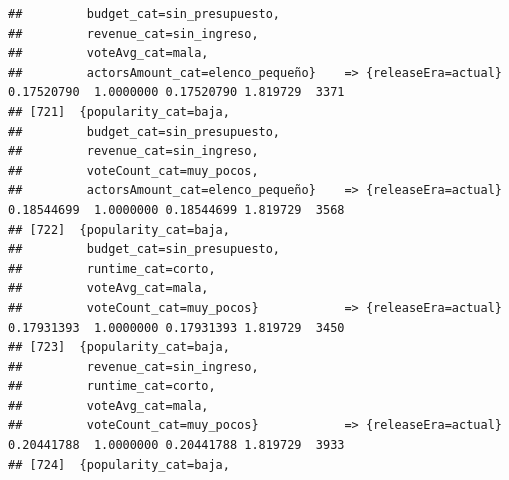 \documentclass[
]{article}
\begin{document}
\begin{verbatim}
##         budget_cat=sin_presupuesto,                                                                                             
##         revenue_cat=sin_ingreso,                                                                                                
##         voteAvg_cat=mala,                                                                                                       
##         actorsAmount_cat=elenco_pequeño}    => {releaseEra=actual}               0.17520790  1.0000000 0.17520790 1.819729  3371
## [721]  {popularity_cat=baja,                                                                                                    
##         budget_cat=sin_presupuesto,                                                                                             
##         revenue_cat=sin_ingreso,                                                                                                
##         voteCount_cat=muy_pocos,                                                                                                
##         actorsAmount_cat=elenco_pequeño}    => {releaseEra=actual}               0.18544699  1.0000000 0.18544699 1.819729  3568
## [722]  {popularity_cat=baja,                                                                                                    
##         budget_cat=sin_presupuesto,                                                                                             
##         runtime_cat=corto,                                                                                                      
##         voteAvg_cat=mala,                                                                                                       
##         voteCount_cat=muy_pocos}            => {releaseEra=actual}               0.17931393  1.0000000 0.17931393 1.819729  3450
## [723]  {popularity_cat=baja,                                                                                                    
##         revenue_cat=sin_ingreso,                                                                                                
##         runtime_cat=corto,                                                                                                      
##         voteAvg_cat=mala,                                                                                                       
##         voteCount_cat=muy_pocos}            => {releaseEra=actual}               0.20441788  1.0000000 0.20441788 1.819729  3933
## [724]  {popularity_cat=baja,                                                                                                    

\end{verbatim}
\end{document}
